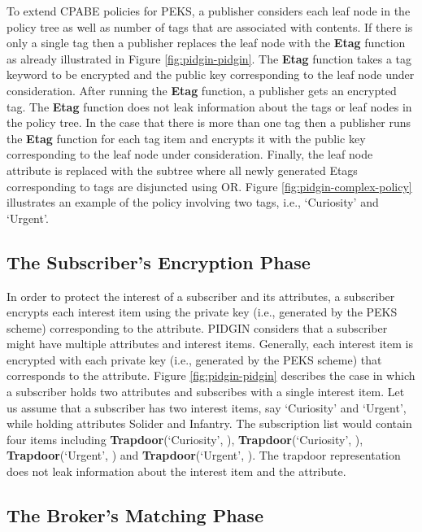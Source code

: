 \documentclass[epsfig,a4paper,11pt,titlepage]{book}
\numberwithin{algorithm}{chapter}
\begin{document}
To extend \gls{CPABE} policies for \gls{PEKS}, a publisher considers each leaf node in the policy tree as well as number of tags that are associated with contents. If there is only a single tag then a publisher replaces the leaf node with the \textbf{Etag} function as already illustrated in Figure \ref{fig:pidgin-pidgin}. The \textbf{Etag} function takes a tag keyword to be encrypted and the public key corresponding to the leaf node under consideration. After running the \textbf{Etag} function, a publisher gets an encrypted tag. The \textbf{Etag} function does not leak information about the tags or leaf nodes in the policy tree. In the case that there is more than one tag then a publisher runs the \textbf{Etag} function for each tag item and encrypts it with the public key corresponding to the leaf node under consideration. Finally, the leaf node attribute is replaced with the subtree where all newly generated Etags corresponding to tags are disjuncted using OR. Figure \ref{fig:pidgin-complex-policy} illustrates an example of the policy involving two tags, i.e., `Curiosity' and `Urgent'.


\subsection{The Subscriber's Encryption Phase}
In order to protect the interest of a subscriber and its attributes, a subscriber encrypts each interest item using the private key (i.e., generated by the \gls{PEKS} scheme) corresponding to the attribute. \gls{PIDGIN} considers that a subscriber might have multiple attributes and interest items. Generally, each interest item is encrypted with each private key (i.e., generated by the \gls{PEKS} scheme) that corresponds to the attribute. Figure \ref{fig:pidgin-pidgin} describes the case in which a subscriber holds two attributes and subscribes with a single interest item. Let us assume that a subscriber has two interest items, say `Curiosity' and `Urgent', while holding attributes Solider and Infantry. The subscription list would contain four items including \textbf{Trapdoor}(`Curiosity', ), \textbf{Trapdoor}(`Curiosity', ), \textbf{Trapdoor}(`Urgent', ) and \textbf{Trapdoor}(`Urgent', ). The trapdoor representation does not leak information about the interest item and the attribute.

\subsection{The Broker's Matching Phase}
\end{document}
